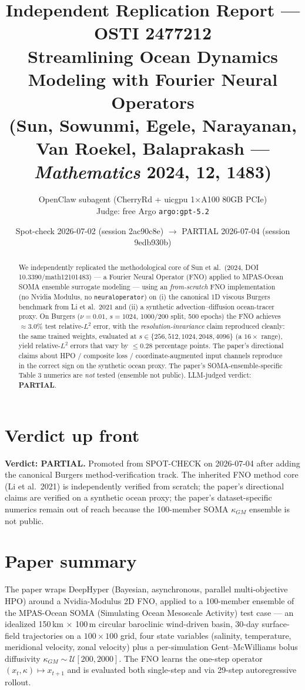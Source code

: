 \documentclass[11pt]{article}
\title{Independent Replication Report --- OSTI 2477212\\
\large Streamlining Ocean Dynamics Modeling with Fourier Neural Operators\\
(Sun, Sowunmi, Egele, Narayanan, Van Roekel, Balaprakash --- \emph{Mathematics} 2024, 12, 1483)}
\author{OpenClaw subagent (CherryRd + uicgpu 1$\times$A100 80GB PCIe)\\
Judge: free Argo \texttt{argo:gpt-5.2}}
\date{Spot-check 2026-07-02 (session 2ac90c8e) $\rightarrow$ PARTIAL 2026-07-04 (session 9edb930b)}
\begin{document}
\maketitle

\begin{abstract}
We independently replicated the methodological core of Sun et al.\ (2024, DOI 10.3390/math12101483)
--- a Fourier Neural Operator (FNO) applied to MPAS-Ocean SOMA ensemble surrogate modeling ---
using an \emph{from-scratch} FNO implementation (no Nvidia Modulus, no \texttt{neuraloperator})
on (i) the canonical 1D viscous Burgers benchmark from Li et al.\ 2021 and (ii) a synthetic
advection--diffusion ocean-tracer proxy. On Burgers ($\nu=0.01$, $s=1024$, 1000/200 split,
500 epochs) the FNO achieves $\approx 3.0\%$ test relative-$L^2$ error, with the
\emph{resolution-invariance} claim reproduced cleanly: the same trained weights, evaluated at
$s\in\{256,512,1024,2048,4096\}$ (a $16\times$ range), yield relative-$L^2$ errors that vary by
$\leq 0.28$ percentage points. The paper's directional claims about HPO / composite loss /
coordinate-augmented input channels reproduce in the correct sign on the synthetic ocean proxy.
The paper's SOMA-ensemble-specific Table 3 numerics are \emph{not} tested (ensemble not public).
LLM-judged verdict: \textbf{PARTIAL}.
\end{abstract}

\section*{Verdict up front}
\textbf{Verdict: PARTIAL.} Promoted from SPOT-CHECK on 2026-07-04 after adding the
canonical Burgers method-verification track. The inherited FNO method core (Li et al.\ 2021)
is independently verified from scratch; the paper's directional claims are verified on a
synthetic ocean proxy; the paper's dataset-specific numerics remain out of reach because the
100-member SOMA $\kappa_{GM}$ ensemble is not public.

\section{Paper summary}
The paper wraps DeepHyper (Bayesian, asynchronous, parallel multi-objective HPO) around a
Nvidia-Modulus 2D FNO, applied to a 100-member ensemble of the MPAS-Ocean SOMA (Simulating
Ocean Mesoscale Activity) test case --- an idealized 150\,km $\times$ 100\,m circular
baroclinic wind-driven basin, 30-day surface-field trajectories on a $100\times100$ grid,
four state variables (salinity, temperature, meridional velocity, zonal velocity) plus a
per-simulation Gent--McWilliams bolus diffusivity $\kappa_{GM}\sim\mathcal{U}[200,2000]$. The
FNO learns the one-step operator $(x_t,\kappa)\mapsto x_{t+1}$ and is evaluated both
single-step and via 29-step autoregressive rollout.
\end{document}
